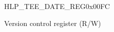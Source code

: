 \begin{register}{H}{LP\_TEE\_DATE\_REG}{0x00FC}\label{regdesc:LPTEEDATEREG}
%
%
\regnewline%
\begin{regdesc}\begin{reglist}
\label{fielddesc:LPTEEDATEREG}\item [LP\_TEE\_DATE\_REG] Version control register (R/W)
\end{reglist}\end{regdesc}
\end{register}